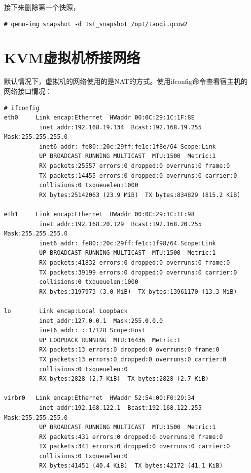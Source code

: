 接下来删除第一个快照，

\begin{verbatim}
# qemu-img snapshot -d 1st_snapshot /opt/taoqi.qcow2
\end{verbatim}

\section{KVM虚拟机桥接网络}
\label{sec:kvmBridgeNetwork}

默认情况下，虚拟机的网络使用的是NAT的方式。使用ifconfig命令查看宿主机的网络接口情况：

\begin{verbatim}
# ifconfig 
eth0     Link encap:Ethernet  HWaddr 00:0C:29:1C:1F:8E  
          inet addr:192.168.19.134  Bcast:192.168.19.255  Mask:255.255.255.0
          inet6 addr: fe80::20c:29ff:fe1c:1f8e/64 Scope:Link
          UP BROADCAST RUNNING MULTICAST  MTU:1500  Metric:1
          RX packets:25557 errors:0 dropped:0 overruns:0 frame:0
          TX packets:14455 errors:0 dropped:0 overruns:0 carrier:0
          collisions:0 txqueuelen:1000 
          RX bytes:25142063 (23.9 MiB)  TX bytes:834829 (815.2 KiB)

eth1     Link encap:Ethernet  HWaddr 00:0C:29:1C:1F:98  
          inet addr:192.168.20.129  Bcast:192.168.20.255  Mask:255.255.255.0
          inet6 addr: fe80::20c:29ff:fe1c:1f98/64 Scope:Link
          UP BROADCAST RUNNING MULTICAST  MTU:1500  Metric:1
          RX packets:41832 errors:0 dropped:0 overruns:0 frame:0
          TX packets:39199 errors:0 dropped:0 overruns:0 carrier:0
          collisions:0 txqueuelen:1000 
          RX bytes:3197973 (3.0 MiB)  TX bytes:13961170 (13.3 MiB)

lo        Link encap:Local Loopback  
          inet addr:127.0.0.1  Mask:255.0.0.0
          inet6 addr: ::1/128 Scope:Host
          UP LOOPBACK RUNNING  MTU:16436  Metric:1
          RX packets:13 errors:0 dropped:0 overruns:0 frame:0
          TX packets:13 errors:0 dropped:0 overruns:0 carrier:0
          collisions:0 txqueuelen:0 
          RX bytes:2828 (2.7 KiB)  TX bytes:2828 (2.7 KiB)

virbr0   Link encap:Ethernet  HWaddr 52:54:00:F0:29:34  
          inet addr:192.168.122.1  Bcast:192.168.122.255  Mask:255.255.255.0
          UP BROADCAST RUNNING MULTICAST  MTU:1500  Metric:1
          RX packets:431 errors:0 dropped:0 overruns:0 frame:0
          TX packets:341 errors:0 dropped:0 overruns:0 carrier:0
          collisions:0 txqueuelen:0 
          RX bytes:41451 (40.4 KiB)  TX bytes:42172 (41.1 KiB)


\end{verbatim}
